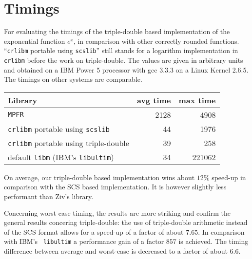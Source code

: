 
\section{Timings}\label{sec:exptiming}
For evaluating the timings of the triple-double based implementation
of the exponential function $e^x$, in comparison with other correctly
rounded functions.  ``{\tt crlibm} portable using {\tt scslib}'' still
stands for a logarithm implementation in {\tt crlibm} before the work
on triple-double. The values are given in arbitrary units and obtained
on a IBM Power 5 processor with gcc 3.3.3 on a Linux Kernel 2.6.5. The
timings on other systems are comparable.
\begin{center}
\begin{tabular}{|l|r|r|}
 \hline
  Library                       &     avg time  & max time \\
 \hline
 \hline
 \texttt{MPFR}   &   2128    & 4908        \\ 
 \hline
 \texttt{crlibm} portable using \texttt{scslib}   &   44    & 1976        \\ 
 \hline
 \texttt{crlibm} portable using triple-double      &        39    & 258        \\ 
 \hline
 default \texttt{libm} (IBM's {\tt libultim})  &        34    & 221062      \\ 
 \hline
\end{tabular}
\end{center}
On average, our triple-double based implementation wins about $12\%$
speed-up in comparison with the SCS based implementation. It is
however slightly less performant than Ziv's library.

Concerning worst case timing, the results are more striking and
confirm the general results concering triple-double: the use of
triple-double arithmetic instead of the SCS format allows for a
speed-up of a factor of about $7.65$. In comparison with IBM's {\tt
libultim} a performance gain of a factor $857$ is achieved. The timing
difference between average and worst-case is decreased to a factor of
about $6.6$.
